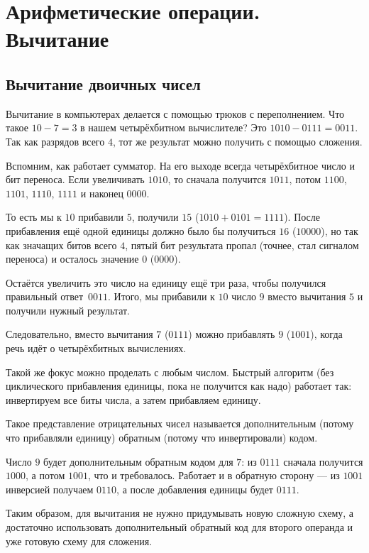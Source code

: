 \chapter{Арифметические операции. Вычитание}

\section{Вычитание двоичных чисел}

Вычитание в компьютерах делается с помощью трюков с переполнением.
Что такое $10-7=3$ в нашем четырёхбитном вычислителе?
Это $1010-0111=0011$. Так как разрядов всего $4$, тот же результат
можно получить с помощью сложения.

Вспомним, как работает сумматор. На его выходе всегда четырёхбитное число
и бит переноса. Если увеличивать $1010$, то сначала получится $1011$,
потом $1100$, $1101$, $1110$, $1111$ и наконец $0000$.

То есть мы к $10$ прибавили $5$, получили $15$
($1010+0101=1111$). После прибавления ещё одной единицы должно было бы получиться
$16$ ($10000$), но так как значащих битов всего $4$, пятый бит результата
пропал (точнее, стал сигналом переноса) и осталось значение $0$ ($0000$).

Остаётся увеличить это число на единицу ещё три раза, чтобы получился
правильный ответ~$0011$. Итого, мы прибавили к $10$ число $9$ вместо вычитания $5$
и получили нужный результат.

Следовательно, вместо вычитания $7$ ($0111$) можно прибавлять $9$ ($1001$),
когда речь идёт о четырёхбитных вычислениях.

Такой же фокус можно проделать с любым числом. Быстрый алгоритм
(без циклического прибавления единицы, пока не получится как надо) работает так:
инвертируем все биты числа, а затем прибавляем единицу.

Такое представление отрицательных чисел
называется дополнительным (потому что прибавляли единицу) обратным (потому что инвертировали) кодом.

Число $9$ будет дополнительным обратным кодом для $7$:
из $0111$ сначала получится $1000$, а потом $1001$, что и требовалось.
Работает и в обратную сторону --- из $1001$ инверсией получаем $0110$,
а после добавления единицы будет $0111$.

Таким образом, для вычитания не нужно придумывать новую сложную схему, а достаточно
использовать дополнительный обратный код для второго операнда и уже готовую схему для сложения.

